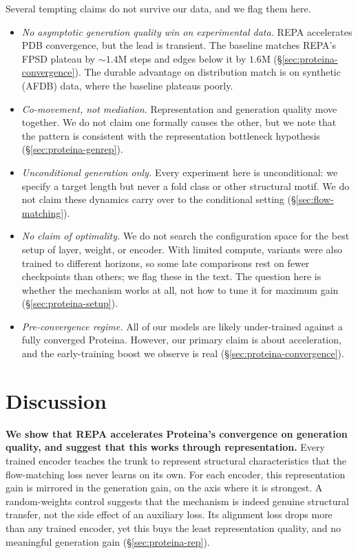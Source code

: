 \documentclass[12pt,a4paper,twoside]{report}
\begin{document}
Several tempting claims do not survive our data, and we flag them here.

\begin{itemize}
  \item \emph{No asymptotic generation quality win on experimental data.} REPA accelerates PDB convergence, but the lead is transient. The baseline matches REPA's FPSD plateau by ${\sim}1.4$M steps and edges below it by $1.6$M (\S\ref{sec:proteina-convergence}). The durable advantage on distribution match is on synthetic (AFDB) data, where the baseline plateaus poorly.
  \item \emph{Co-movement, not mediation.} Representation and generation quality move together. We do not claim one formally causes the other, but we note that the pattern is consistent with the representation bottleneck hypothesis (\S\ref{sec:proteina-genrep}).
  \item \emph{Unconditional generation only.} Every experiment here is unconditional: we specify a target length but never a fold class or other structural motif. We do not claim these dynamics carry over to the conditional setting (\S\ref{sec:flow-matching}).
  \item \emph{No claim of optimality.} We do not search the configuration space for the best setup of layer, weight, or encoder. With limited compute, variants were also trained to different horizons, so some late comparisons rest on fewer checkpoints than others; we flag these in the text. The question here is whether the mechanism works at all, not how to tune it for maximum gain (\S\ref{sec:proteina-setup}).
  \item \emph{Pre-convergence regime.} All of our models are likely under-trained against a fully converged Proteina. However, our primary claim is about acceleration, and the early-training boost we observe is real (\S\ref{sec:proteina-convergence}).
\end{itemize}

\section{Discussion}
\label{sec:proteina-discussion}

\textbf{We show that REPA accelerates Proteina's convergence on generation quality, and suggest that this works through representation.} Every trained encoder teaches the trunk to represent structural characteristics that the flow-matching loss never learns on its own. For each encoder, this representation gain is mirrored in the generation gain, on the axis where it is strongest. A random-weights control suggests that the mechanism is indeed genuine structural transfer, not the side effect of an auxiliary loss. Its alignment loss drops more than any trained encoder, yet this buys the least representation quality, and no meaningful generation gain (\S\ref{sec:proteina-rep}).
\end{document}
